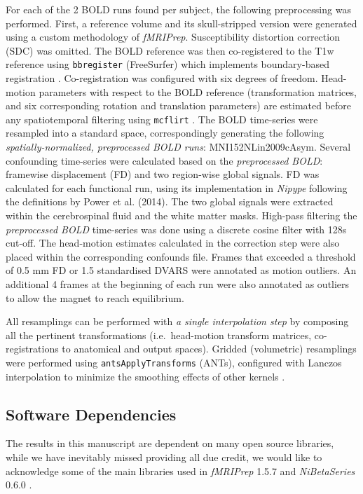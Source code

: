 \documentclass[10pt,letterpaper]{article}
\begin{document}
For each of the 2 BOLD runs found per subject,
the following preprocessing was performed.
First, a reference volume and its skull-stripped version were generated
using a custom methodology of \emph{fMRIPrep}.
Susceptibility distortion correction (SDC) was omitted.
The BOLD reference was then co-registered to the T1w reference using \texttt{bbregister}
(FreeSurfer) which implements boundary-based registration \cite{bbr}.
Co-registration was configured with six degrees of freedom.
Head-motion parameters with respect to the BOLD reference (transformation matrices,
and six corresponding rotation and translation parameters) are estimated before any
spatiotemporal filtering using \texttt{mcflirt} \cite[FSL 5.0.9,]{mcflirt}.
The BOLD time-series were resampled into a standard space, correspondingly
generating the following \emph{spatially-normalized, preprocessed BOLD runs}:
MNI152NLin2009cAsym.
Several confounding time-series were calculated based on the \emph{preprocessed BOLD}:
framewise displacement (FD) and two region-wise global signals.
FD was calculated for each functional run, using its
implementation in \emph{Nipype} following the definitions
by Power et al. (2014)\cite{power_fd_dvars}.
The two global signals were extracted within the
cerebrospinal fluid and the white matter masks.
High-pass filtering the \emph{preprocessed BOLD} time-series was done using
a discrete cosine filter with 128s cut-off.
The head-motion estimates calculated in
the correction step were also placed within the corresponding confounds file. 
Frames that exceeded a threshold of 0.5 mm FD or 1.5 standardised DVARS
were annotated as motion outliers.
An additional 4 frames at the beginning of each run were also
annotated as outliers to allow the magnet to reach equilibrium.

All resamplings can be performed with \emph{a single interpolation step} by composing all the pertinent
transformations (i.e.~head-motion transform matrices, co-registrations to anatomical
and output spaces).
Gridded (volumetric) resamplings were performed using \texttt{antsApplyTransforms} (ANTs),
configured with Lanczos interpolation to minimize the smoothing effects of other kernels
\cite{lanczos}.

\subsection*{Software Dependencies}
\label{methods:software-dependencies}

The results in this manuscript are dependent on many open source
libraries, while we have inevitably missed providing all due credit,
we would like to acknowledge some of the main libraries used in 
\emph{fMRIPrep} 1.5.7 \cite{fmriprep1} and \emph{NiBetaSeries} 0.6.0 \cite{Kent2018}.
\end{document}
